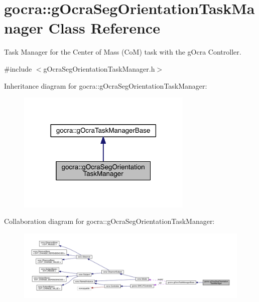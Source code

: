 \hypertarget{classgocra_1_1gOcraSegOrientationTaskManager}{}\section{gocra\+:\+:g\+Ocra\+Seg\+Orientation\+Task\+Manager Class Reference}
\label{classgocra_1_1gOcraSegOrientationTaskManager}


Task Manager for the Center of Mass (CoM) task with the g\+Ocra Controller.  




{\ttfamily \#include $<$g\+Ocra\+Seg\+Orientation\+Task\+Manager.\+h$>$}



Inheritance diagram for gocra\+:\+:g\+Ocra\+Seg\+Orientation\+Task\+Manager\+:\nopagebreak
\begin{figure}[H]
\begin{center}
\leavevmode
\includegraphics[width=237pt]{d0/d24/classgocra_1_1gOcraSegOrientationTaskManager__inherit__graph}
\end{center}
\end{figure}


Collaboration diagram for gocra\+:\+:g\+Ocra\+Seg\+Orientation\+Task\+Manager\+:\nopagebreak
\begin{figure}[H]
\begin{center}
\leavevmode
\includegraphics[width=350pt]{de/d46/classgocra_1_1gOcraSegOrientationTaskManager__coll__graph}
\end{center}
\end{figure}
